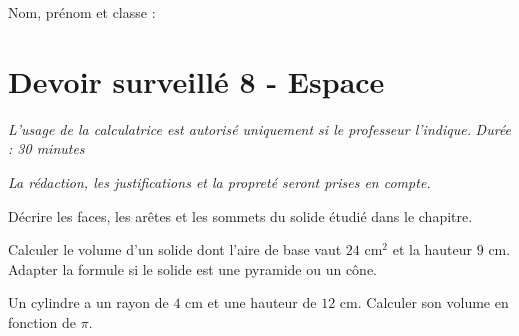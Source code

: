 \documentclass[a4paper,10pt]{report}
\begin{document}
\pagestyle{empty}
\noindent Nom, prénom et classe : \dotfill

\section*{Devoir surveillé 8 - Espace}

\noindent \textit{L'usage de la calculatrice est autorisé uniquement si le professeur l'indique.} \hfill \textit{Durée : 30 minutes}

\medskip
\noindent \textit{La rédaction, les justifications et la propreté seront prises en compte.}


\begin{ex}[Vocabulaire]
Décrire les faces, les arêtes et les sommets du solide étudié dans le chapitre.
\medskip\noindent\grandscarreaux{\linewidth}{3cm}
\end{ex}
\begin{ex}[Volume]
Calculer le volume d'un solide dont l'aire de base vaut $24$ cm$^2$ et la hauteur $9$ cm. Adapter la formule si le solide est une pyramide ou un cône.
\medskip\noindent\grandscarreaux{\linewidth}{4cm}
\end{ex}
\begin{ex}[Problème]
Un cylindre a un rayon de $4$ cm et une hauteur de $12$ cm. Calculer son volume en fonction de $\pi$.
\medskip\noindent\grandscarreaux{\linewidth}{4cm}
\end{ex}
\end{document}
